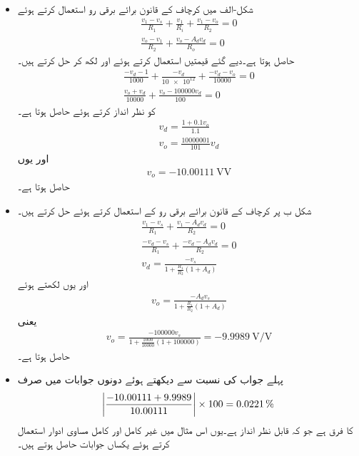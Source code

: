 \begin{itemize}
\item
شکل-الف میں کرچاف کے قانون برائے برقی رو استعمال کرتے ہوئے
\begin{align*}
\frac{v_1-v_s}{R_1}+\frac{v_1}{R_i}+\frac{v_1-v_o}{R_2}=0\\
\frac{v_o-v_1}{R_2}+\frac{v_o-A_d v_d}{R_o}=0
\end{align*}
حاصل ہوتا ہے۔دیے گئے قیمتیں استعمال کرتے ہوئے اور  لکھ کر حل کرتے ہیں۔
\begin{align*}
\frac{-v_d-1}{\num{1000}}+\frac{-v_d}{\num{10e12}}+\frac{-v_d-v_o}{\num{10000}}=0\\
\frac{v_o+v_d}{\num{10000}}+\frac{v_o-\num{100000} v_d}{\num{100}}=0
\end{align*}
 کو نظر انداز کرتے ہوئے  حاصل ہوتا ہے۔
\begin{align*}
v_d=\frac{1+0.1 v_o}{1.1}\\
v_o=\frac{\num{10000001}}{101} v_d
\end{align*}
 اور یوں
\begin{align*}
v_o=\SI{-10.00111}{\volt  \volt}
\end{align*}
حاصل ہوتا ہے۔
\item
شکل  ب پر کرچاف کے قانون برائے برقی رو کے استعمال کرتے ہوئے حل کرتے ہیں۔
\begin{align*}
\frac{v_1-v_s}{R_1}+\frac{v_1-A_d v_d}{R_2}=0\\
\frac{-v_d-v_s}{R_1}+\frac{-v_d-A_d v_d}{R_2}=0\\
v_d=\frac{-v_s}{1+\frac{R_1}{R_2}\left(1+A_d \right)}
\end{align*}
اور یوں  لکھتے ہوئے
\begin{align} \label{مساوات_حسابی_کامل_مثال_حل}
v_o=\frac{-A_d v_s}{1+\frac{R_1}{R_2}\left(1+A_d \right)}
\end{align}
یعنی
\begin{align*}
v_o=\frac{-\num{100000} v_s}{1+\frac{\num{1000}}{\num{10000}}\left(1+\num{100000} \right)}=\SI{-9.9989}{\volt\per \volt}
\end{align*}
حاصل ہوتا ہے۔
\item
پہلے جواب کی نسبت سے دیکھتے ہوئے دونوں جوابات میں صرف
\begin{align*}
\abs{\frac{-10.00111+9.9989}{10.00111}} \times 100=\SI{0.0221}{\percent}
\end{align*}
کا فرق ہے جو کہ قابل نظر انداز ہے۔یوں اس مثال میں غیر کامل اور کامل مساوی ادوار استعمال کرتے ہوئے یکساں جوابات حاصل ہوتے ہیں۔
\end{itemize}

